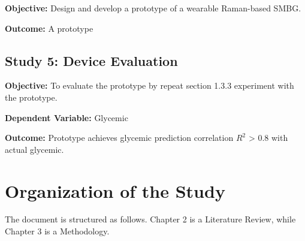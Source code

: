 \textbf{Objective:} Design and develop a prototype of a wearable Raman-based SMBG.

\textbf{Outcome:} A prototype

\subsection{Study 5: Device Evaluation}
\textbf{Objective:} To evaluate the prototype by repeat section 1.3.3 experiment with the prototype.

\textbf{Dependent Variable:} Glycemic

\textbf{Outcome:} Prototype achieves glycemic prediction correlation $R^2$ > 0.8 with actual glycemic.


\section{Organization of the Study}
The document is structured as follows. Chapter 2 is a Literature Review, while Chapter 3 is a Methodology.